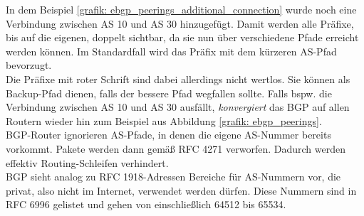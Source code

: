 In dem Beispiel \ref{grafik: ebgp_peerings_additional_connection} wurde noch eine Verbindung zwischen AS 10 und AS 30 hinzugefügt. Damit werden alle Präfixe, bis auf die eigenen, doppelt sichtbar, da sie nun über verschiedene Pfade erreicht werden können. Im Standardfall wird das Präfix mit dem kürzeren AS-Pfad bevorzugt.\\
Die Präfixe mit roter Schrift sind dabei allerdings nicht wertlos. Sie können als Backup-Pfad dienen, falls der bessere Pfad wegfallen sollte. Falls bspw. die Verbindung zwischen AS 10 und AS 30 ausfällt, \textit{konvergiert} das BGP auf allen Routern wieder hin zum Beispiel aus Abbildung \ref{grafik: ebgp_peerings}.\\
BGP-Router ignorieren AS-Pfade, in denen die eigene AS-Nummer bereits vorkommt. Pakete werden dann gemäß RFC 4271 verworfen. Dadurch werden effektiv Routing-Schleifen verhindert\cite{rfc4271}.\\
BGP sieht analog zu RFC 1918-Adressen Bereiche für AS-Nummern vor, die privat, also nicht im Internet, verwendet werden dürfen. Diese Nummern sind in RFC 6996 gelistet und gehen von einschließlich 64512 bis 65534\cite{rfc6996}.





